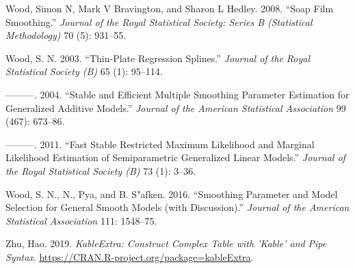 \documentclass[conference,final,]{IEEEtran}
\newlength{\cslhangindent}
\newenvironment{cslreferences}%
  {\setlength{\parindent}{0pt}%
  \everypar{\setlength{\hangindent}{\cslhangindent}}\ignorespaces}%
  {\par}
\begin{document}
\begin{cslreferences}
\leavevmode\hypertarget{ref-wood2008soap}{}%
Wood, Simon N, Mark V Bravington, and Sharon L Hedley. 2008. ``Soap Film Smoothing.'' \emph{Journal of the Royal Statistical Society: Series B (Statistical Methodology)} 70 (5): 931--55.

\leavevmode\hypertarget{ref-R-mgcv_d}{}%
Wood, S. N. 2003. ``Thin-Plate Regression Splines.'' \emph{Journal of the Royal Statistical Society (B)} 65 (1): 95--114.

\leavevmode\hypertarget{ref-R-mgcv_c}{}%
---------. 2004. ``Stable and Efficient Multiple Smoothing Parameter Estimation for Generalized Additive Models.'' \emph{Journal of the American Statistical Association} 99 (467): 673--86.

\leavevmode\hypertarget{ref-R-mgcv_a}{}%
---------. 2011. ``Fast Stable Restricted Maximum Likelihood and Marginal Likelihood Estimation of Semiparametric Generalized Linear Models.'' \emph{Journal of the Royal Statistical Society (B)} 73 (1): 3--36.

\leavevmode\hypertarget{ref-R-mgcv_b}{}%
Wood, S. N., N., Pya, and B. S"afken. 2016. ``Smoothing Parameter and Model Selection for General Smooth Models (with Discussion).'' \emph{Journal of the American Statistical Association} 111: 1548--75.

\leavevmode\hypertarget{ref-R-kableExtra}{}%
Zhu, Hao. 2019. \emph{KableExtra: Construct Complex Table with 'Kable' and Pipe Syntax}. \url{https://CRAN.R-project.org/package=kableExtra}.
\end{cslreferences}
\end{document}
